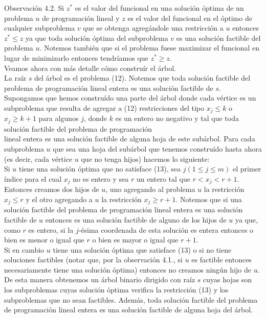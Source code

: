 \documentclass[10pt]{article}
\begin{document}
Observación 4.2. Si $z^{*}$ es el valor del funcional en una solución óptima de un problema $u$ de programación lineal y $z$ es el valor del funcional en el óptimo de cualquier subproblema $v$ que se obtenga agregándole una restricción a $u$ entonces $z^{*} \leq z$ ya que toda solución óptima del subproblema $v$ es una solución factible del problema $u$. Notemos también que si el problema fuese maximizar el funcional en lugar de minimizarlo entonces tendríamos que $z^{*} \geq z$.\\
Veamos ahora con más detalle cómo construír el árbol.\\
La raíz $s$ del árbol es el problema (12). Notemos que toda solución factible del problema de programación lineal entera es una solución factible de $s$. Supongamos que hemos construído una parte del árbol donde cada vértice es un subproblema que resulta de agregar a (12) restricciones del tipo $x_{j} \leq k$ o $x_{j} \geq k+1$ para algunos $j$, donde $k$ es un entero no negativo y tal que toda solución factible del problema de programación\\
lineal entera es una solución factible de alguna hoja de este subárbol. Para cada subproblema $u$ que sea una hoja del subárbol que tenemos construído hasta ahora (es decir, cada vértice $u$ que no tenga hijos) hacemos lo siguiente:\\
Si $u$ tiene una solución óptima que no satisface (13), sea $j(1 \leq j \leq m)$ el primer índice para el cual $x_{j}$ no es entero y sea $r$ un entero tal que $r<x_{j}<r+1$. Entonces creamos dos hijos de $u$, uno agregando al problema $u$ la restricción $x_{j} \leq r$ y el otro agregando a $u$ la restricción $x_{j} \geq r+1$. Notemos que si una solución factible del problema de programación lineal entera es una solución factible de $u$ entonces es una solución factible de alguno de los hijos de $u$ ya que, como $r$ es entero, si la $j$-ésima coordenada de esta solución es entera entonces o bien es menor o igual que $r$ o bien es mayor o igual que $r+1$.\\
Si en cambio $u$ tiene una solución óptima que satisface (13) o si no tiene soluciones factibles (notar que, por la observación 4.1., si $u$ es factible entonces necesariamente tiene una solución óptima) entonces no creamos ningún hijo de $u$.\\
De esta manera obtenemos un árbol binario dirigido con raíz $s$ cuyas hojas son los subproblemas cuyas solución óptima verifica la restricción (13) y los subproblemas que no sean factibles. Además, toda solución factible del problema de programación lineal entera es una solución factible de alguna hoja del árbol.\\
\end{document}
